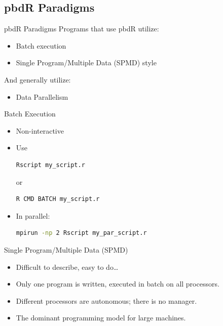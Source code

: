 \subsection{pbdR Paradigms}

\begin{frame}
  \begin{block}{pbdR Paradigms}
  Programs that use pbdR utilize:
  \begin{itemize}[<+-|alert@+>]
   \item Batch execution
   \item Single Program/Multiple Data (SPMD) style
   \\[.2cm]
   \end{itemize}
    And generally utilize:
   \begin{itemize}
   \item Data Parallelism
  \end{itemize}
  \end{block}
\end{frame}


\begin{frame}[fragile]
  \begin{block}{Batch Execution}\pause
    \begin{itemize}
      \item Non-interactive
      \item Use
\vspace{-.4cm}
\begin{lstlisting}[language=sh]
Rscript my_script.r
\end{lstlisting}
or\vspace{-.4cm}
\begin{lstlisting}[language=sh]
R CMD BATCH my_script.r
\end{lstlisting}
      \item In parallel:
\vspace{-.4cm}
\begin{lstlisting}[language=sh]
mpirun -np 2 Rscript my_par_script.r
\end{lstlisting}
    \end{itemize}
  \end{block}
\end{frame}



\begin{frame}
  \begin{block}{Single Program/Multiple Data (SPMD)}\pause
    \begin{itemize}
      \item Difficult to describe, easy to do\dots
      \item Only one program is written, executed in batch on all processors.
      \item Different processors are autonomous; there is no manager.
      \item The dominant programming model for large machines.
    \end{itemize}
  \end{block}
\end{frame}

